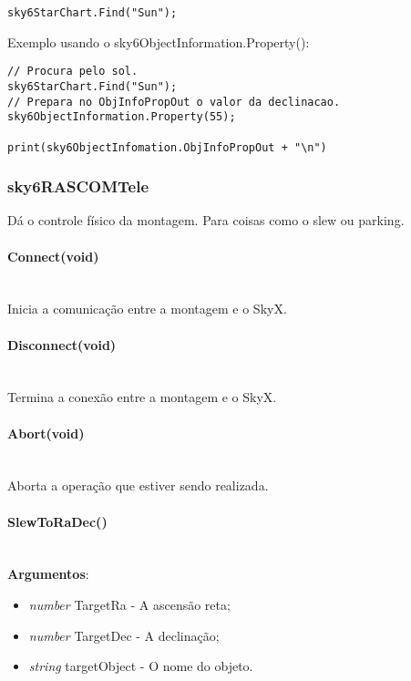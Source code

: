 \documentclass{article}
\begin{document}
\begin{lstlisting}
sky6StarChart.Find("Sun");
\end{lstlisting}

Exemplo usando o sky6ObjectInformation.Property():

\begin{lstlisting}
// Procura pelo sol.
sky6StarChart.Find("Sun");
// Prepara no ObjInfoPropOut o valor da declinacao.
sky6ObjectInformation.Property(55);

print(sky6ObjectInfomation.ObjInfoPropOut + "\n")
\end{lstlisting}

\subsubsection{sky6RASCOMTele}

Dá o controle físico da montagem. Para coisas como o slew ou parking.

\paragraph{Connect(void)}\mbox{}\\

Inicia a comunicação entre a montagem e o SkyX.

\paragraph{Disconnect(void)}\mbox{}\\

Termina a conexão entre a montagem e o SkyX.

\paragraph{Abort(void)}\mbox{}\\

Aborta a operação que estiver sendo realizada.

\paragraph{SlewToRaDec()}\mbox{}\\

\textbf{Argumentos}:

\begin{itemize}
    \item \emph{number} TargetRa - A ascensão reta;
    \item \emph{number} TargetDec - A declinação;
    \item \emph{string} targetObject - O nome do objeto.
\end{itemize}
\end{document}

